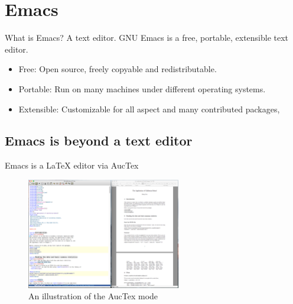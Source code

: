 \documentclass[presentation]{beamer}
\begin{document}
\section{Emacs}
\label{sec:org1c63e8b}

\begin{frame}[label={sec:orgc1d29dc}]{What is Emacs? A text editor.}
GNU Emacs is a free, portable, extensible text editor.

\begin{itemize}
\item Free: Open source, freely copyable and redistributable.
\item Portable: Run on many machines under different operating systems.
\item Extensible: Customizable for all aspect and  many contributed packages,
\end{itemize}
\end{frame}


\subsection{Emacs is beyond a text editor}
\label{sec:org1ff839e}

\begin{frame}[label={sec:orgc973548}]{Emacs is a \LaTeX{} editor via AucTex}
\begin{figure}[htbp]
\centering
\includegraphics[width=0.6\textwidth]{figure/auctex_example.png}
\caption{An illustration of the AucTex mode}
\end{figure}
\end{frame}
\end{document}
